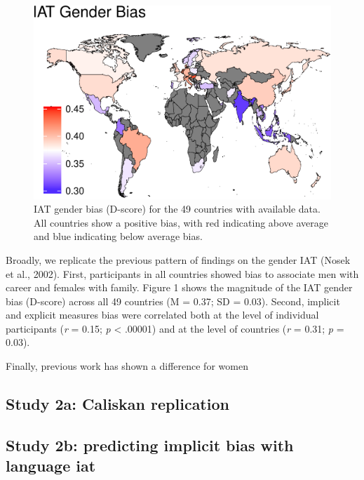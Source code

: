 \documentclass[10pt, letterpaper]{article}
\newenvironment{CodeChunk}{}{}
\begin{document}
\begin{CodeChunk}
\begin{figure}[t]

{\centering \includegraphics{figs/map-1} 

}

\caption[IAT gender bias (D-score) for the 49 countries with available data]{IAT gender bias (D-score) for the 49 countries with available data. All countries show a positive bias, with red indicating above average and blue indicating below average bias.}\label{fig:map}
\end{figure}
\end{CodeChunk}

Broadly, we replicate the previous pattern of findings on the gender IAT
(Nosek et al., 2002). First, participants in all countries showed bias
to associate men with career and females with family. Figure 1 shows the
magnitude of the IAT gender bias (D-score) across all 49 countries (M =
0.37; SD = 0.03). Second, implicit and explicit measures bias were
correlated both at the level of individual participants (\emph{r} =
0.15; \emph{p} \textless{} .00001) and at the level of countries
(\emph{r} = 0.31; \emph{p} = 0.03).

Finally, previous work has shown a difference for women

\subsection{Study 2a: Caliskan
replication}\label{study-2a-caliskan-replication}

\subsection{Study 2b: predicting implicit bias with language
iat}\label{study-2b-predicting-implicit-bias-with-language-iat}
\end{document}
